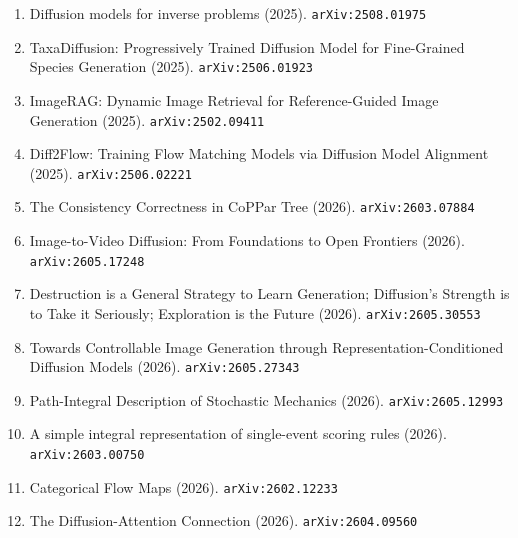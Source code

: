 \documentclass[11pt]{article}
\begin{document}
\begin{enumerate}
  \item Diffusion models for inverse problems (2025). \texttt{arXiv:2508.01975}
  \item TaxaDiffusion: Progressively Trained Diffusion Model for Fine-Grained Species Generation (2025). \texttt{arXiv:2506.01923}
  \item ImageRAG: Dynamic Image Retrieval for Reference-Guided Image Generation (2025). \texttt{arXiv:2502.09411}
  \item Diff2Flow: Training Flow Matching Models via Diffusion Model Alignment (2025). \texttt{arXiv:2506.02221}
  \item The Consistency Correctness in CoPPar Tree (2026). \texttt{arXiv:2603.07884}
  \item Image-to-Video Diffusion: From Foundations to Open Frontiers (2026). \texttt{arXiv:2605.17248}
  \item Destruction is a General Strategy to Learn Generation; Diffusion's Strength is to Take it Seriously; Exploration is the Future (2026). \texttt{arXiv:2605.30553}
  \item Towards Controllable Image Generation through Representation-Conditioned Diffusion Models (2026). \texttt{arXiv:2605.27343}
  \item Path-Integral Description of Stochastic Mechanics (2026). \texttt{arXiv:2605.12993}
  \item A simple integral representation of single-event scoring rules (2026). \texttt{arXiv:2603.00750}
  \item Categorical Flow Maps (2026). \texttt{arXiv:2602.12233}
  \item The Diffusion-Attention Connection (2026). \texttt{arXiv:2604.09560}
\end{enumerate}
\end{document}
